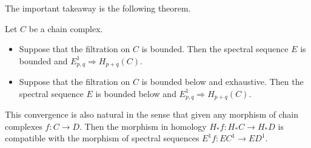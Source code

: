 \documentclass[../thesis.tex]{subfiles}
\begin{document}
        The important takeaway is the following theorem.
        \begin{thm}
            Let $C$ be a chain complex.
            \begin{itemize}
                \item Suppose that the filtration on $C$ is bounded. Then the spectral sequence $E$ is bounded and $E^1_{p,q} \Rightarrow H_{p+q}(C)$.
                \item Suppose that the filtration on $C$ is bounded below and exhaustive. Then the spectral sequence $E$ is bounded below and $E^1_{p,q} \Rightarrow H_{p+q}(C)$.
            \end{itemize}
            This convergence is also natural in the sense that given any morphism of chain complexes $f : C \rightarrow D$. Then the morphism in homology $H_*f : H_*C \rightarrow H_*D$ is compatible with the morphism of spectral sequences $E^1f : EC^1 \rightarrow ED^1$.
        \end{thm}
\end{document}
